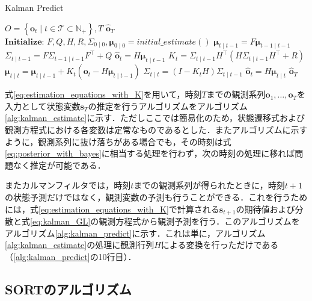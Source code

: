     \begin{algorithm}[t]
        \caption[Kalman Predict]{Kalman Predict}
        \label{alg:kalman_predict}
        \begin{algorithmic}[1]
            \Require $O = \left\{\bm{o}_t \mid t \in \mathcal{T} \subset \mathbb{N}_+\right\}, T$
            \Ensure $\hat{\bm{o}}_T$
            \State $\textbf{Initialize: } F, Q, H, R, \Sigma_{0 \mid 0}, \bm{\mu}_{0 \mid 0} = initial\_estimate()$
                \State $\bm{\mu}_{t \mid t-1} = F \bm{\mu}_{t-1 \mid t-1}$
                \State $\Sigma_{t \mid t-1} = F \Sigma_{t-1 \mid t-1} F^{\top} + Q$
                \State $\hat{\bm{o}}_t = H \bm{\mu}_{t \mid t-1}$
                    \State $K_t = \Sigma_{t \mid t-1} H^{\top} \left( H \Sigma_{t \mid t-1} H^{\top} + R\right)$
                    \State $\bm{\mu}_{t \mid t} = \bm{\mu}_{t \mid t-1} + K_t \left( \bm{o}_t - H \bm{\mu}_{t \mid t-1} \right)$
                    \State $\Sigma_{t \mid t} = \left( I - K_t H \right) \Sigma_{t \mid t-1}$
                    \State $\hat{\bm{o}}_t = H \bm{\mu}_{t \mid t}$
                \EndIf
            \EndFor
            \State \Return $\hat{\bm{o}}_T$
        \end{algorithmic}
    \end{algorithm}

    式\ref{eq:estimation_equations_with_K}を用いて，時刻$T$までの観測系列$\bm{o}_1, \dots, \bm{o}_T$を入力として状態変数$\bm{s}_T$の推定を行うアルゴリズムをアルゴリズム\ref{alg:kalman_estimate}に示す．ただしここでは簡易化のため，状態遷移式および観測方程式における各変数は定常なものであるとした．またアルゴリズムに示すように，観測系列に抜け落ちがある場合でも，その時刻は式\ref{eq:posterior_with_bayes}に相当する処理を行わず，次の時刻の処理に移れば問題なく推定が可能である．

    またカルマンフィルタでは，時刻$t$までの観測系列が得られたときに，時刻$t+1$の状態予測だけではなく，観測変数の予測も行うことができる．これを行うためには，式\ref{eq:estimation_equations_with_K}で計算される$\bm{s}_{t+1}$の期待値および分散と式\ref{eq:kalman_GL}の観測方程式から観測予測を行う．このアルゴリズムをアルゴリズム\ref{alg:kalman_predict}に示す．これは単に，アルゴリズム\ref{alg:kalman_estimate}の処理に観測行列$H$による変換を行っただけである（\ref{alg:kalman_predict}の10行目）．

    \subsection{SORTのアルゴリズム}
    \label{subsec:sort_algorithm}

